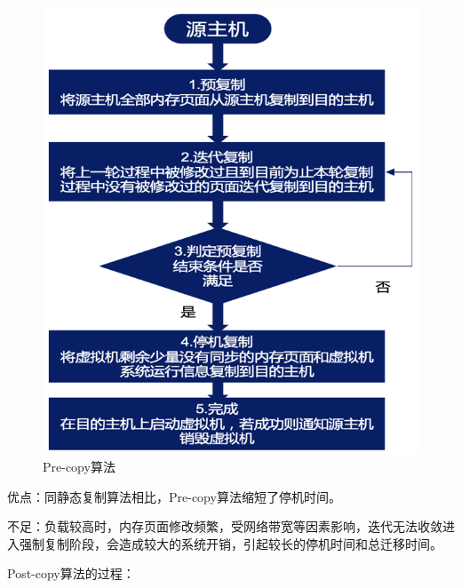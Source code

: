 \begin{figure}[ht]
  \centering
  \includegraphics{./Figure/IMG_Chap2_4.png}
  \caption{Pre-copy算法}\label{Fig:chap2_4}
\end{figure}

优点：同静态复制算法相比，Pre-copy算法缩短了停机时间。

不足：负载较高时，内存页面修改频繁，受网络带宽等因素影响，迭代无法收敛进入强制复制阶段，会造成较大的系统开销，引起较长的停机时间和总迁移时间。

Post-copy算法的过程：

